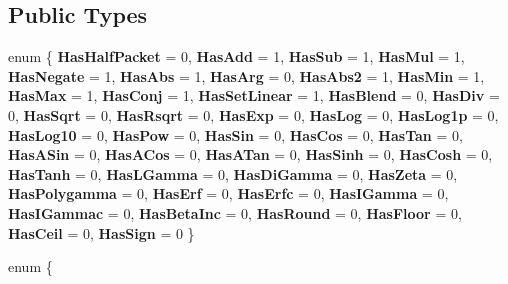 \subsection*{Public Types}
\begin{DoxyCompactItemize}
\item 
\mbox{\label{struct_eigen_1_1internal_1_1default__packet__traits_a3c615752eb09815a1c03d1dafe1b0e39}} 
enum \{ \newline
{\bfseries Has\+Half\+Packet} = 0, 
{\bfseries Has\+Add} = 1, 
{\bfseries Has\+Sub} = 1, 
{\bfseries Has\+Mul} = 1, 
\newline
{\bfseries Has\+Negate} = 1, 
{\bfseries Has\+Abs} = 1, 
{\bfseries Has\+Arg} = 0, 
{\bfseries Has\+Abs2} = 1, 
\newline
{\bfseries Has\+Min} = 1, 
{\bfseries Has\+Max} = 1, 
{\bfseries Has\+Conj} = 1, 
{\bfseries Has\+Set\+Linear} = 1, 
\newline
{\bfseries Has\+Blend} = 0, 
{\bfseries Has\+Div} = 0, 
{\bfseries Has\+Sqrt} = 0, 
{\bfseries Has\+Rsqrt} = 0, 
\newline
{\bfseries Has\+Exp} = 0, 
{\bfseries Has\+Log} = 0, 
{\bfseries Has\+Log1p} = 0, 
{\bfseries Has\+Log10} = 0, 
\newline
{\bfseries Has\+Pow} = 0, 
{\bfseries Has\+Sin} = 0, 
{\bfseries Has\+Cos} = 0, 
{\bfseries Has\+Tan} = 0, 
\newline
{\bfseries Has\+A\+Sin} = 0, 
{\bfseries Has\+A\+Cos} = 0, 
{\bfseries Has\+A\+Tan} = 0, 
{\bfseries Has\+Sinh} = 0, 
\newline
{\bfseries Has\+Cosh} = 0, 
{\bfseries Has\+Tanh} = 0, 
{\bfseries Has\+L\+Gamma} = 0, 
{\bfseries Has\+Di\+Gamma} = 0, 
\newline
{\bfseries Has\+Zeta} = 0, 
{\bfseries Has\+Polygamma} = 0, 
{\bfseries Has\+Erf} = 0, 
{\bfseries Has\+Erfc} = 0, 
\newline
{\bfseries Has\+I\+Gamma} = 0, 
{\bfseries Has\+I\+Gammac} = 0, 
{\bfseries Has\+Beta\+Inc} = 0, 
{\bfseries Has\+Round} = 0, 
\newline
{\bfseries Has\+Floor} = 0, 
{\bfseries Has\+Ceil} = 0, 
{\bfseries Has\+Sign} = 0
 \}
\item 
\mbox{\label{struct_eigen_1_1internal_1_1default__packet__traits_aaa2157f75f2b9798540e0af9434547c3}} 
enum \{ \newline

\end{DoxyCompactItemize}
